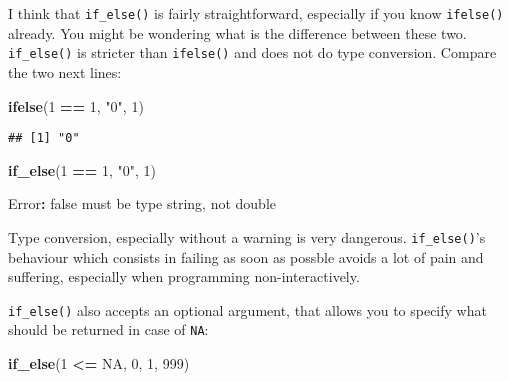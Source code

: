 \documentclass[
]{article}
\newenvironment{Shaded}{\begin{snugshade}}{\end{snugshade}}
\newcommand{\DataTypeTok}[1]{\textcolor[rgb]{0.13,0.29,0.53}{#1}}
\newcommand{\DecValTok}[1]{\textcolor[rgb]{0.00,0.00,0.81}{#1}}
\newcommand{\KeywordTok}[1]{\textcolor[rgb]{0.13,0.29,0.53}{\textbf{#1}}}
\newcommand{\NormalTok}[1]{#1}
\newcommand{\OperatorTok}[1]{\textcolor[rgb]{0.81,0.36,0.00}{\textbf{#1}}}
\newcommand{\OtherTok}[1]{\textcolor[rgb]{0.56,0.35,0.01}{#1}}
\newcommand{\StringTok}[1]{\textcolor[rgb]{0.31,0.60,0.02}{#1}}
\begin{document}
I think that \texttt{if\_else()} is fairly straightforward, especially if you know \texttt{ifelse()} already. You
might be wondering what is the difference between these two. \texttt{if\_else()} is stricter than
\texttt{ifelse()} and does not do type conversion. Compare the two next lines:

\begin{Shaded}
\begin{Highlighting}[]
\KeywordTok{ifelse}\NormalTok{(}\DecValTok{1} \OperatorTok{==}\StringTok{ }\DecValTok{1}\NormalTok{, }\StringTok{"0"}\NormalTok{, }\DecValTok{1}\NormalTok{)}
\end{Highlighting}
\end{Shaded}

\begin{verbatim}
## [1] "0"
\end{verbatim}

\begin{Shaded}
\begin{Highlighting}[]
\KeywordTok{if\_else}\NormalTok{(}\DecValTok{1} \OperatorTok{==}\StringTok{ }\DecValTok{1}\NormalTok{, }\StringTok{"0"}\NormalTok{, }\DecValTok{1}\NormalTok{)}
\end{Highlighting}
\end{Shaded}

\begin{Shaded}
\begin{Highlighting}[]
\NormalTok{Error}\OperatorTok{:}\StringTok{ \textasciigrave{}}\DataTypeTok{false}\StringTok{\textasciigrave{}}\NormalTok{ must be type string, not double}
\end{Highlighting}
\end{Shaded}

Type conversion, especially without a warning is very dangerous. \texttt{if\_else()}'s behaviour which
consists in failing as soon as possble avoids a lot of pain and suffering, especially when
programming non-interactively.

\texttt{if\_else()} also accepts an optional argument, that allows you to specify what should be returned
in case of \texttt{NA}:

\begin{Shaded}
\begin{Highlighting}[]
\KeywordTok{if\_else}\NormalTok{(}\DecValTok{1} \OperatorTok{\textless{}=}\StringTok{ }\OtherTok{NA}\NormalTok{, }\DecValTok{0}\NormalTok{, }\DecValTok{1}\NormalTok{, }\DecValTok{999}\NormalTok{)}
\end{Highlighting}
\end{Shaded}
\end{document}
